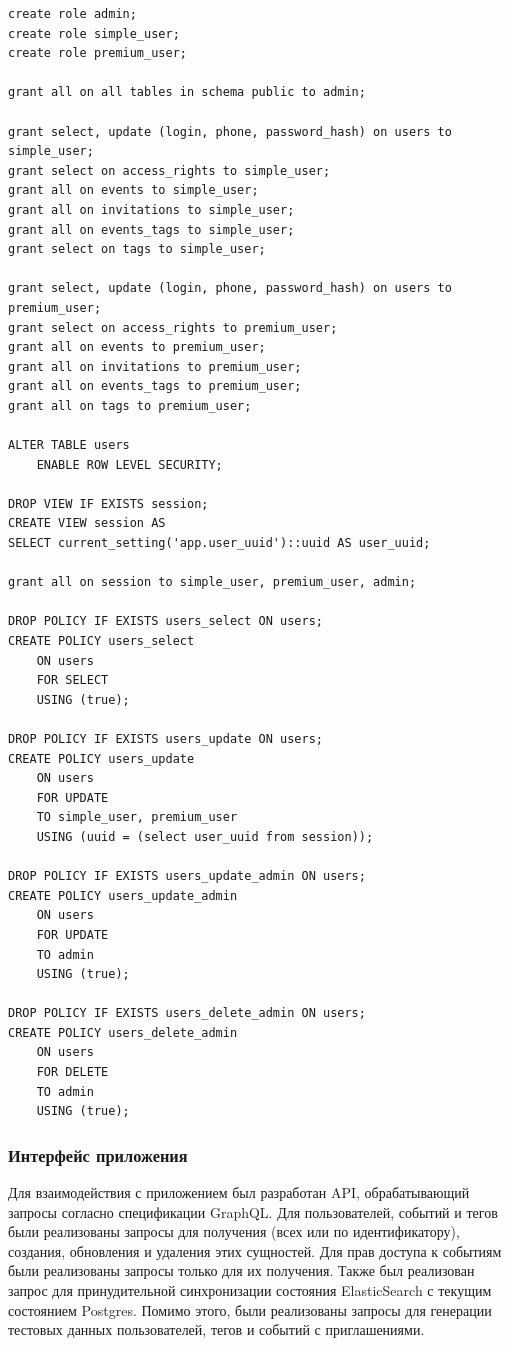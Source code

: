 \begin{center}
	\captionsetup{justification=raggedright,singlelinecheck=off}
	\begin{lstlisting}[label=lst:roles,caption=Описание ролей]
create role admin;
create role simple_user;
create role premium_user;

grant all on all tables in schema public to admin;

grant select, update (login, phone, password_hash) on users to simple_user;
grant select on access_rights to simple_user;
grant all on events to simple_user;
grant all on invitations to simple_user;
grant all on events_tags to simple_user;
grant select on tags to simple_user;

grant select, update (login, phone, password_hash) on users to premium_user;
grant select on access_rights to premium_user;
grant all on events to premium_user;
grant all on invitations to premium_user;
grant all on events_tags to premium_user;
grant all on tags to premium_user;

ALTER TABLE users
	ENABLE ROW LEVEL SECURITY;

DROP VIEW IF EXISTS session;
CREATE VIEW session AS
SELECT current_setting('app.user_uuid')::uuid AS user_uuid;

grant all on session to simple_user, premium_user, admin;

DROP POLICY IF EXISTS users_select ON users;
CREATE POLICY users_select
	ON users
	FOR SELECT
	USING (true);

DROP POLICY IF EXISTS users_update ON users;
CREATE POLICY users_update
	ON users
	FOR UPDATE
	TO simple_user, premium_user
	USING (uuid = (select user_uuid from session));

DROP POLICY IF EXISTS users_update_admin ON users;
CREATE POLICY users_update_admin
	ON users
	FOR UPDATE
	TO admin
	USING (true);

DROP POLICY IF EXISTS users_delete_admin ON users;
CREATE POLICY users_delete_admin
	ON users
	FOR DELETE
	TO admin
	USING (true);
\end{lstlisting}
\end{center}
\clearpage

\subsubsection{Интерфейс приложения}

Для взаимодействия с приложением был разработан API, обрабатывающий запросы согласно спецификации GraphQL. Для пользователей, событий и тегов были реализованы запросы для получения (всех или по идентификатору), создания, обновления и удаления этих сущностей. Для прав доступа к событиям были реализованы запросы только для их получения. Также был реализован запрос для принудительной синхронизации состояния ElasticSearch с текущим состоянием Postgres. Помимо этого, были реализованы запросы для генерации тестовых данных пользователей, тегов и событий с приглашениями.

